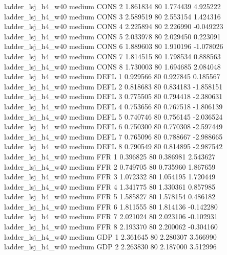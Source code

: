   ladder_lsj_h4_w40     medium     CONS                 2  1.861834 80       1.774439           4.925222
  ladder_lsj_h4_w40     medium     CONS                 3  2.589519 80       2.553154           1.424316
  ladder_lsj_h4_w40     medium     CONS                 4  2.225894 80       2.226990          -0.049223
  ladder_lsj_h4_w40     medium     CONS                 5  2.033978 80       2.029450           0.223091
  ladder_lsj_h4_w40     medium     CONS                 6  1.889603 80       1.910196          -1.078026
  ladder_lsj_h4_w40     medium     CONS                 7  1.814515 80       1.798534           0.888563
  ladder_lsj_h4_w40     medium     CONS                 8  1.730003 80       1.694685           2.084048
  ladder_lsj_h4_w40     medium     DEFL                 1  0.929566 80       0.927845           0.185567
  ladder_lsj_h4_w40     medium     DEFL                 2  0.818683 80       0.834183          -1.858151
  ladder_lsj_h4_w40     medium     DEFL                 3  0.775505 80       0.794418          -2.380631
  ladder_lsj_h4_w40     medium     DEFL                 4  0.753656 80       0.767518          -1.806139
  ladder_lsj_h4_w40     medium     DEFL                 5  0.740746 80       0.756145          -2.036524
  ladder_lsj_h4_w40     medium     DEFL                 6  0.750300 80       0.770308          -2.597449
  ladder_lsj_h4_w40     medium     DEFL                 7  0.765096 80       0.788667          -2.988665
  ladder_lsj_h4_w40     medium     DEFL                 8  0.790549 80       0.814895          -2.987542
  ladder_lsj_h4_w40     medium      FFR                 1  0.396825 80       0.386981           2.543627
  ladder_lsj_h4_w40     medium      FFR                 2  0.749705 80       0.735960           1.867659
  ladder_lsj_h4_w40     medium      FFR                 3  1.072332 80       1.054195           1.720449
  ladder_lsj_h4_w40     medium      FFR                 4  1.341775 80       1.330361           0.857985
  ladder_lsj_h4_w40     medium      FFR                 5  1.585827 80       1.578154           0.486182
  ladder_lsj_h4_w40     medium      FFR                 6  1.811555 80       1.814136          -0.142280
  ladder_lsj_h4_w40     medium      FFR                 7  2.021024 80       2.023106          -0.102931
  ladder_lsj_h4_w40     medium      FFR                 8  2.193370 80       2.200062          -0.304160
  ladder_lsj_h4_w40     medium      GDP                 1  2.361645 80       2.280307           3.566990
  ladder_lsj_h4_w40     medium      GDP                 2  2.263830 80       2.187000           3.512996
